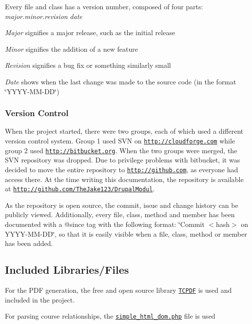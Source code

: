 Every file and class has a version number, composed of four parts\+: {\itshape major.\+minor.\+revision} {\itshape date} 
\begin{DoxyItemize}
\item {\itshape Major} signifies a major release, such as the initial release
\item {\itshape Minor} signifies the addition of a new feature
\item {\itshape Revision} signifies a bug fix or something similarly small
\item {\itshape Date} shows when the last change was made to the source code (in the format \char`\"{}\+Y\+Y\+Y\+Y-\/\+M\+M-\/\+D\+D\char`\"{})
\end{DoxyItemize}\hypertarget{index_versioncontrol}{}\subsubsection{Version Control}\label{index_versioncontrol}
When the project started, there were two groups, each of which used a different version control system. Group 1 used S\+V\+N on \href{http://cloudforge.com}{\tt http\+://cloudforge.\+com} while group 2 used \href{http://bitbucket.org}{\tt http\+://bitbucket.\+org}. When the two groups were merged, the S\+V\+N repository was dropped. Due to privilege problems with bitbucket, it was decided to move the entire repository to \href{http://github.com}{\tt http\+://github.\+com}, as everyone had access there. At the time writing this documentation, the repository is available at \href{http://github.com/TheJake123/DrupalModul}{\tt http\+://github.\+com/\+The\+Jake123/\+Drupal\+Modul}.

As the repository is open source, the commit, issue and change history can be publicly viewed. Additionally, every file, class, method and member has been documented with a {\ttfamily @since} tag with the following format\+: \char`\"{}\+Commit $<$hash$>$ on Y\+Y\+Y\+Y-\/\+M\+M-\/\+D\+D\char`\"{}, so that it is easily visible when a file, class, method or member has been added.\hypertarget{index_Included}{}\subsection{Included Libraries/\+Files}\label{index_Included}
For the P\+D\+F generation, the free and open source library \href{http://www.tcpdf.org/}{\tt T\+C\+P\+D\+F} is used and included in the project.

For parsing course relationships, the \href{http://simplehtmldom.sourceforge.net/}{\tt simple\+\_\+html\+\_\+dom.\+php} file is used 